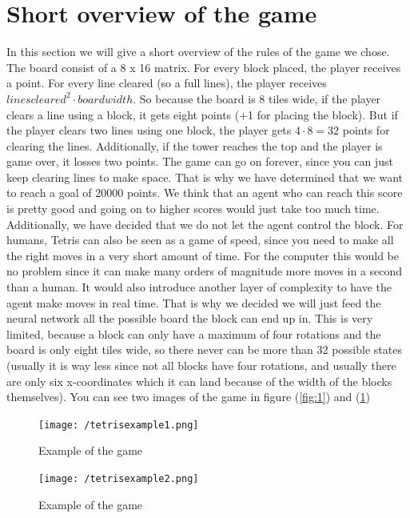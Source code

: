 \documentclass{report}
\begin{document}
\section{Short overview of the game}
In this section we will give a short overview of the rules of the game we chose.\\
The board consist of a 8 x 16 matrix. For every block placed, the player receives a point. For every line cleared (so a full lines), the player receives $lines cleared^2 \cdot board width$. So because the board is 8 tiles wide, if the player clears a line using a block, it gets eight points (+1 for placing the block). But if the player clears two lines using one block, the player gets $4\cdot8 = 32$ points for clearing the lines. Additionally, if the tower reaches the top and the player is game over, it losses two points. The game can go on forever, since you can just keep clearing lines to make space. That is why we have determined that we want to reach a goal of 20000 points. We think that an agent who can reach this score is pretty good and going on to higher scores would just take too much time.
Additionally, we have decided that we do not let the agent control the block. For humans, Tetris can also be seen as a game of speed, since you need to make all the right moves in a very short amount of time. For the computer this would be no problem since it can make many orders of magnitude more moves in a second than a human. It would also introduce another layer of complexity to have the agent make moves in real time. That is why we decided we will just feed the neural network all the possible board the block can end up in. This is very limited, because a block can only have a maximum of four rotations and the board is only eight tiles wide, so there never can be more than 32 possible states (usually it is way less since not all blocks have four rotations, and usually there are only six x-coordinates which it can land because of the width of the blocks themselves). You can see two images of the game in figure (\ref{fig:1}) and (\ref{fig:2})
\begin{figure}[h!]
	\centering
	\begin{minipage}[t]{0.45\textwidth}
   		\texttt{[image: /tetrisexample1.png]}
    	\caption{Example of the game}
    	\label{fig:1}
 	\end{minipage}
  	\begin{minipage}[t]{0.45\textwidth}
    	 \texttt{[image: /tetrisexample2.png]}
    	\caption{Example of the game}
    	\label{fig:2}
 	\end{minipage}
\end{figure}
\end{document}
